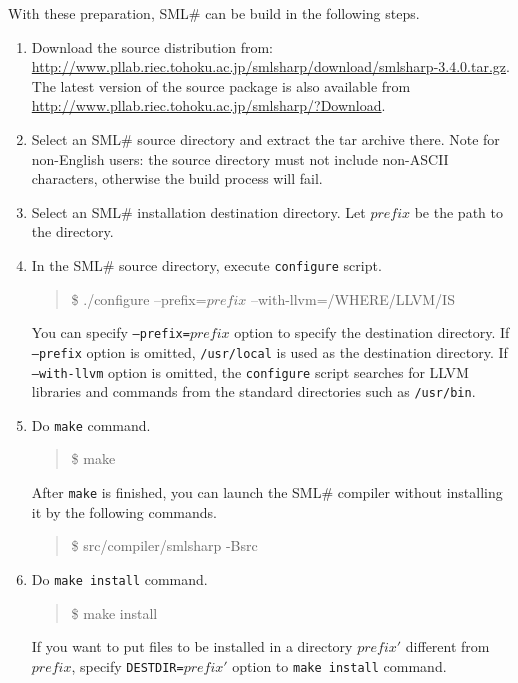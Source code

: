 \documentclass{jbook}
\newcommand{\smlsharp}{SML\#}
\newcommand{\version}{3.4.0}
\newcommand\eurl[1]{{\edef\eurlTMP{{#1}}\expandafter\url\eurlTMP}}
\newenvironment{program}{\begin{quote}\begin{tt}}%
                        {\end{tt}\end{quote}}
\begin{document}
	With these preparation, \smlsharp{} can be build in the
following steps.
\begin{enumerate}
\item Download the source distribution from:
\eurl{http://www.pllab.riec.tohoku.ac.jp/smlsharp/download/smlsharp-\version.tar.gz}.
	The latest version of the source package is also available from
\url{http://www.pllab.riec.tohoku.ac.jp/smlsharp/?Download}.
\item Select an \smlsharp{} source directory and extract the tar archive there.
	Note for non-English users:
the source directory must not include non-ASCII characters,
otherwise the build process will fail.
\item Select an \smlsharp{} installation destination directory.
Let $\mathit{prefix}$ be the path to the directory.
\item
	In the \smlsharp{} source directory, execute {\tt configure} script.
\begin{program}
\$ ./configure --prefix=$\mathit{prefix}$ --with-llvm=/WHERE/LLVM/IS
\end{program}
	You can specify {\tt --prefix=$\mathit{prefix}$} option to specify
the destination directory.
	If {\tt --prefix} option is omitted, {\tt /usr/local} is used as
the destination directory.
	If {\tt --with-llvm} option is omitted, the {\tt configure} script
searches for LLVM libraries and commands from the standard directories
such as {\tt /usr/bin}.

\item
	Do {\tt make} command.
\begin{program}
\$ make
\end{program}
	After {\tt make} is finished,
you can launch the \smlsharp{} compiler
without installing it
by the following commands.
\begin{program}
\$ src/compiler/smlsharp -Bsrc
\end{program}
\item
	Do {\tt make install} command.
\begin{program}
\$ make install
\end{program}
	If you want to put files to be installed in a directory
$\mathit{prefix}'$ different from $\mathit{prefix}$, specify
{\tt DESTDIR=$\mathit{prefix}'$} option to {\tt make install} command.
\end{enumerate}
\end{document}
